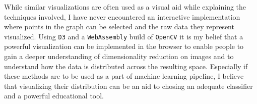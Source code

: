 \documentclass[9pt, letterpaper]{article}
\begin{document}

\vspace{15pt}

While similar visualizations are often used as a visual aid while explaining the techniques involved, I have never encountered an interactive implementation where points in the graph can be selected and the raw data they represent visualized. Using \texttt{D3} and a \texttt{WebAssembly} build of \texttt{OpenCV} it is my belief that a powerful visualization can be implemented in the browser to enable people to gain a deeper understanding of dimensionality reduction on images and to understand how the data is distributed across the resulting space. Especially if these methods are to be used as a part of machine learning pipeline, I believe that visualizing their distribution can be an aid to chosing  an adequate classifier and a powerful educational tool. 
\end{document}
